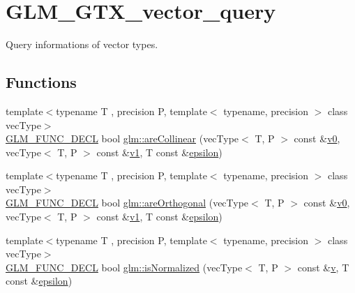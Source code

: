 \hypertarget{group__gtx__vector__query}{}\section{G\+L\+M\+\_\+\+G\+T\+X\+\_\+vector\+\_\+query}
\label{group__gtx__vector__query}


Query informations of vector types.  


\subsection*{Functions}
\begin{DoxyCompactItemize}
\item 
{\footnotesize template$<$typename T , precision P, template$<$ typename, precision $>$ class vec\+Type$>$ }\\\mbox{\hyperlink{setup_8hpp_ab2d052de21a70539923e9bcbf6e83a51}{G\+L\+M\+\_\+\+F\+U\+N\+C\+\_\+\+D\+E\+CL}} bool \mbox{\hyperlink{group__gtx__vector__query_ga465b844190d1740051e45d780832ea4c}{glm\+::are\+Collinear}} (vec\+Type$<$ T, P $>$ const \&\mbox{\hyperlink{glad_8h_a7062a23d1d434121d4a88f530703d06a}{v0}}, vec\+Type$<$ T, P $>$ const \&\mbox{\hyperlink{glad_8h_a0779c3b73f9aa3a0ac5b0139b5d291d9}{v1}}, T const \&\mbox{\hyperlink{group__gtc__constants_ga2a1e57fc5592b69cfae84174cbfc9429}{epsilon}})
\item 
{\footnotesize template$<$typename T , precision P, template$<$ typename, precision $>$ class vec\+Type$>$ }\\\mbox{\hyperlink{setup_8hpp_ab2d052de21a70539923e9bcbf6e83a51}{G\+L\+M\+\_\+\+F\+U\+N\+C\+\_\+\+D\+E\+CL}} bool \mbox{\hyperlink{group__gtx__vector__query_gaee10acefed397c11e01f2862e837754c}{glm\+::are\+Orthogonal}} (vec\+Type$<$ T, P $>$ const \&\mbox{\hyperlink{glad_8h_a7062a23d1d434121d4a88f530703d06a}{v0}}, vec\+Type$<$ T, P $>$ const \&\mbox{\hyperlink{glad_8h_a0779c3b73f9aa3a0ac5b0139b5d291d9}{v1}}, T const \&\mbox{\hyperlink{group__gtc__constants_ga2a1e57fc5592b69cfae84174cbfc9429}{epsilon}})
\item 
{\footnotesize template$<$typename T , precision P, template$<$ typename, precision $>$ class vec\+Type$>$ }\\\mbox{\hyperlink{setup_8hpp_ab2d052de21a70539923e9bcbf6e83a51}{G\+L\+M\+\_\+\+F\+U\+N\+C\+\_\+\+D\+E\+CL}} bool \mbox{\hyperlink{group__gtx__vector__query_ga6fa5fa2af67d14c205d24c49aad03270}{glm\+::is\+Normalized}} (vec\+Type$<$ T, P $>$ const \&\mbox{\hyperlink{glad_8h_a14cfbe2fc2234f5504618905b69d1e06}{v}}, T const \&\mbox{\hyperlink{group__gtc__constants_ga2a1e57fc5592b69cfae84174cbfc9429}{epsilon}})

\end{DoxyCompactItemize}
